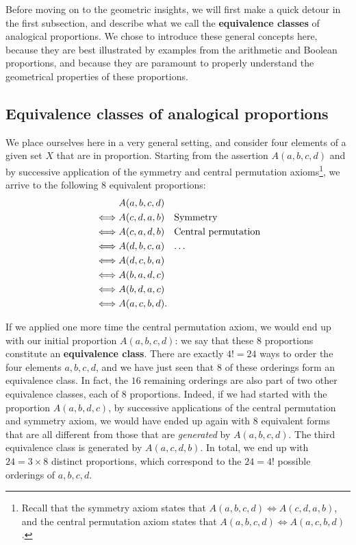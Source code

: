 Before moving on to the geometric insights, we will first make a quick
detour in the first subsection, and describe what we call the
\textbf{equivalence classes} of analogical proportions. We chose to introduce
these general concepts here, because they are best illustrated by examples from
the arithmetic and Boolean proportions, and because they are paramount to
properly understand the geometrical properties of these proportions.

\subsection{Equivalence classes of analogical proportions}

We place ourselves here in a very general setting, and consider four elements of
a given set $X$ that are in proportion.  Starting from the assertion $A(a, b,
c, d)$ and by successive application of the symmetry and central permutation
axioms\footnote{Recall that the symmetry axiom states that $A(a, b, c, d)
\iff A(c, d, a, b)$, and the central permutation axiom states that $A(a, b,
c, d) \iff A(a, c, b, d)$.}, we arrive to the following $8$ equivalent
proportions:
\begin{align*}
       &A(a, b, c, d)\\
  \iff &A(c, d, a, b) \text{~~ Symmetry}\\
  \iff &A(c, a, d, b) \text{~~ Central permutation}\\
  \iff &A(d, b, c, a) \text{~~ \dots}\\
  \iff &A(d, c, b, a)\\
  \iff &A(b, a, d, c)\\
  \iff &A(b, d, a, c)\\
  \iff &A(a, c, b, d).
\end{align*}

If we applied one more time the central permutation axiom, we would end up with
our initial proportion $A(a,b,c,d)$: we say that these $8$ proportions
constitute an \textbf{equivalence class}. There are exactly $4! = 24$ ways to
order the four elements $a, b, c, d$, and we have just seen that $8$ of these
orderings form an equivalence class. In fact, the $16$ remaining orderings are
also part of two other equivalence classes, each of $8$ proportions. Indeed, if we had
started with the proportion $A(a,b,d,c)$, by successive applications of the
central permutation and symmetry axiom, we would have ended up again with $8$
equivalent forms that are all different from those that are \textit{generated}
by $A(a, b, c, d)$. The third equivalence class is generated by $A(a, c, d, b)$.
In total, we end up with $24 = 3 \times 8$ distinct proportions, which
correspond to the $24 = 4!$ possible orderings of $a, b, c, d$.

